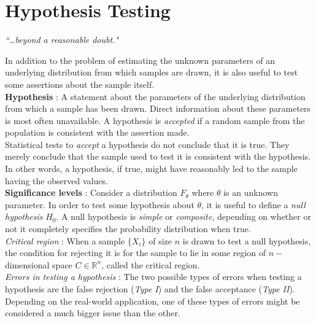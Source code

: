 \chapter{Hypothesis Testing}


\begin{flushright}
	\textit{``\dots beyond a reasonable doubt."} \\
\end{flushright}

In addition to the problem of estimating the unknown parameters of an underlying distribution from which samples are drawn, it is also useful to test some assertions about the sample itself. \\

\textbf{Hypothesis} : A statement about the parameters of the underlying distribution from which a sample has been drawn. Direct information about these parameters is most often unavailable. A hypothesis is \textit{accepted} if a random sample from the population is consistent with the assertion made. \\

Statistical tests to \textit{accept} a hypothesis do not conclude that it is true. They merely conclude that the sample used to test it is consistent with the hypothesis. In other words, a hypothesis, if true, might have reasonably led to the sample having the observed values.\\


\textbf{Significance levels} : Consider a distribution $ F_\theta $ where $ \theta $ is an unknown parameter. In order to test some hypothesis about $ \theta $, it is useful to define a \textit{null hypothesis} $ H_0 $. A null hypothesis is \textit{simple} or \textit{composite}, depending on whether or not it completely specifies the probability distribution when true.\\

\textit{Critical region} : When a sample $ \{X_i\} $ of size $ n $ is drawn to test a null hypothesis, the condition for rejecting it is for the sample to lie in some region of $ n -$dimensional space $ C \in \mathbb{R}^n $, called the critical region.\\

\textit{Errors in testing a hypothesis} : The two possible types of errors when testing a hypothesis are the false rejection (\textit{Type I}) and the false acceptance (\textit{Type II}). Depending on the real-world application, one of these types of errors might be considered a much bigger issue than the other.\\


